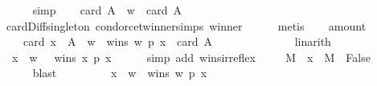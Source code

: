 \begin{isabellebody}
\ \ \ \ \isamarkupfalse%
\ simp\isanewline
\ \ \isamarkupfalse%
\ {\isachardoublequoteopen}card\ {\isacharparenleft}{\kern0pt}A\ {\isacharminus}{\kern0pt}\ {\isacharbraceleft}{\kern0pt}w{\isacharbraceright}{\kern0pt}{\isacharparenright}{\kern0pt}\ {\isacharequal}{\kern0pt}\ card\ A\ {\isacharminus}{\kern0pt}\ {}{\isachardoublequoteclose}\isanewline
\ \ \ \ \isamarkupfalse%
\ card{\isacharunderscore}{\kern0pt}Diff{\isacharunderscore}{\kern0pt}singleton\ condorcet{\isacharunderscore}{\kern0pt}winner{\isachardot}{\kern0pt}simps\ winner\isanewline
\ \ \ \ \isamarkupfalse%
\ metis\isanewline
\ \ \isamarkupfalse%
\ amount{}{\isacharcolon}{\kern0pt}\isanewline
\ \ \ \ {\isachardoublequoteopen}card\ {\isacharbraceleft}{\kern0pt}x\ {\isasymin}\ A\ {\isacharminus}{\kern0pt}\ {\isacharbraceleft}{\kern0pt}w{\isacharbraceright}{\kern0pt}\ {\isachardot}{\kern0pt}\ wins\ w\ p\ x{\isacharbraceright}{\kern0pt}\ {\isacharequal}{\kern0pt}\ card\ {\isacharparenleft}{\kern0pt}A{\isacharparenright}{\kern0pt}\ {\isacharminus}{\kern0pt}\ {}{\isachardoublequoteclose}\isanewline
\ \ \ \ \isamarkupfalse%
\ {\isachardoublequoteopen}{}{}{\isachardoublequoteclose}\isanewline
\ \ \ \ \isamarkupfalse%
\ linarith\isanewline
\ \ \isamarkupfalse%
\ {}{\isacharcolon}{\kern0pt}\ {\isachardoublequoteopen}{\isasymforall}x\ {\isasymin}\ {\isacharbraceleft}{\kern0pt}w{\isacharbraceright}{\kern0pt}\ {\isachardot}{\kern0pt}\ {\isasymnot}\ wins\ x\ p\ x{\isachardoublequoteclose}\isanewline
\ \ \ \ \isamarkupfalse%
\ {\isacharparenleft}{\kern0pt}simp\ add{\isacharcolon}{\kern0pt}\ wins{\isacharunderscore}{\kern0pt}irreflex{\isacharparenright}{\kern0pt}\isanewline
\ \ \isamarkupfalse%
\ {}{\isacharcolon}{\kern0pt}\ {\isachardoublequoteopen}{\isasymforall}M\ {\isachardot}{\kern0pt}\ {\isacharbraceleft}{\kern0pt}x\ {\isasymin}\ M\ {\isachardot}{\kern0pt}\ False{\isacharbraceright}{\kern0pt}\ {\isacharequal}{\kern0pt}\ {\isacharbraceleft}{\kern0pt}{\isacharbraceright}{\kern0pt}{\isachardoublequoteclose}\isanewline
\ \ \ \ \isamarkupfalse%
\ blast\isanewline
\ \ \isamarkupfalse%
\ {}\ {}\isanewline
\ \ \isamarkupfalse%
\ {\isachardoublequoteopen}{\isacharbraceleft}{\kern0pt}x\ {\isasymin}\ {\isacharbraceleft}{\kern0pt}w{\isacharbraceright}{\kern0pt}\ {\isachardot}{\kern0pt}\ wins\ w\ p\ x{\isacharbraceright}{\kern0pt}\ {\isacharequal}{\kern0pt}\ {\isacharbraceleft}{\kern0pt}{\isacharbraceright}{\kern0pt}{\isachardoublequoteclose}\isanewline

\end{isabellebody}
